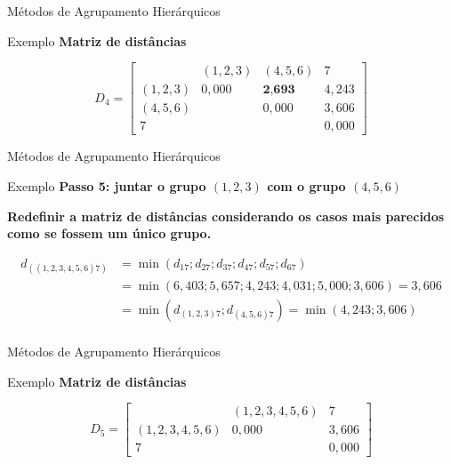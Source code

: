 \documentclass[
  ignorenonframetext,
  aspectratio=169,
]{beamer}
\begin{document}
\begin{frame}{Métodos de Agrupamento Hierárquicos}
\label{muxe9todos-de-agrupamento-hieruxe1rquicos-27}
\begin{block}{Exemplo}
\label{exemplo-16}
\textbf{Matriz de distâncias}

\[D_4 = \left[ \begin{matrix}
&(1,2,3) &(4,5,6) &7\\ 
(1,2,3)& 0,000 & \textbf{2,693} &  4,243 \\
(4,5,6)    &  & 0,000 &  3,606 \\
7  &       &  & 0,000
                    \end{matrix} \right]\]
\end{block}
\end{frame}

\begin{frame}{Métodos de Agrupamento Hierárquicos}
\label{muxe9todos-de-agrupamento-hieruxe1rquicos-28}
\begin{block}{Exemplo}
\label{exemplo-17}
\textbf{Passo 5: juntar o grupo \((1,2,3)\) com o grupo \((4,5,6)\)}

\textbf{Redefinir a matriz de distâncias considerando os casos mais
parecidos como se fossem um único grupo.}

\[
\begin{aligned}
d_{((1,2,3,4,5,6)7)} &=  \min(d_{17};d_{27};d_{37};d_{47};d_{57};d_{67}) \\ 
&= \min(6,403; 5,657; 4,243; 4,031; 5,000; 3,606) = 3,606 \\ &= 
\min(d_{(1,2,3)7};d_{(4,5,6)7}) = \min(4,243; 3,606) \\
\end{aligned}
\]
\end{block}
\end{frame}

\begin{frame}{Métodos de Agrupamento Hierárquicos}
\label{muxe9todos-de-agrupamento-hieruxe1rquicos-29}
\begin{block}{Exemplo}
\label{exemplo-18}
\textbf{Matriz de distâncias}

\[D_5 = \left[ \begin{matrix}
&(1,2,3,4,5,6) & 7\\ 
(1,2,3,4,5,6 )& 0,000 & 3,606 \\
7         &  & 0,000
                    \end{matrix} \right]\]
\end{block}
\end{frame}
\end{document}
